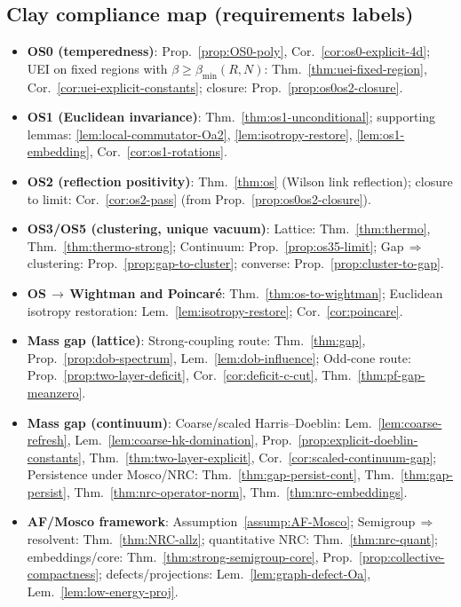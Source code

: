 \documentclass[11pt]{amsart}
\theoremstyle{plain}
\theoremstyle{definition}
\theoremstyle{remark}
\begin{document}
\subsection*{Clay compliance map (requirements \textrightarrow{} labels)}
\begin{itemize}
  \item \textbf{OS0 (temperedness)}: Prop.~\ref{prop:OS0-poly}, Cor.~\ref{cor:os0-explicit-4d}; UEI on fixed regions with $\beta\ge \beta_{\min}(R,N)$: Thm.~\ref{thm:uei-fixed-region}, Cor.~\ref{cor:uei-explicit-constants}; closure: Prop.~\ref{prop:os0os2-closure}.
  \item \textbf{OS1 (Euclidean invariance)}: Thm.~\ref{thm:os1-unconditional}; supporting lemmas: \ref{lem:local-commutator-Oa2}, \ref{lem:isotropy-restore}, \ref{lem:os1-embedding}, Cor.~\ref{cor:os1-rotations}.
  \item \textbf{OS2 (reflection positivity)}: Thm.~\ref{thm:os} (Wilson link reflection); closure to limit: Cor.~\ref{cor:os2-pass} (from Prop.~\ref{prop:os0os2-closure}).
  \item \textbf{OS3/OS5 (clustering, unique vacuum)}: Lattice: Thm.~\ref{thm:thermo}, Thm.~\ref{thm:thermo-strong}; Continuum: Prop.~\ref{prop:os35-limit}; Gap\,$\Rightarrow$\,clustering: Prop.~\ref{prop:gap-to-cluster}; converse: Prop.~\ref{prop:cluster-to-gap}.
  \item \textbf{OS\,$\to$\,Wightman and Poincar\'e}: Thm.~\ref{thm:os-to-wightman}; Euclidean isotropy restoration: Lem.~\ref{lem:isotropy-restore}; Cor.~\ref{cor:poincare}.
  \item \textbf{Mass gap (lattice)}: Strong-coupling route: Thm.~\ref{thm:gap}, Prop.~\ref{prop:dob-spectrum}, Lem.~\ref{lem:dob-influence}; Odd-cone route: Prop.~\ref{prop:two-layer-deficit}, Cor.~\ref{cor:deficit-c-cut}, Thm.~\ref{thm:pf-gap-meanzero}.
  \item \textbf{Mass gap (continuum)}: Coarse/scaled Harris--Doeblin: Lem.~\ref{lem:coarse-refresh}, Lem.~\ref{lem:coarse-hk-domination}, Prop.~\ref{prop:explicit-doeblin-constants}, Thm.~\ref{thm:two-layer-explicit}, Cor.~\ref{cor:scaled-continuum-gap}; Persistence under Mosco/NRC: Thm.~\ref{thm:gap-persist-cont}, Thm.~\ref{thm:gap-persist}, Thm.~\ref{thm:nrc-operator-norm}, Thm.~\ref{thm:nrc-embeddings}.
  \item \textbf{AF/Mosco framework}: Assumption~\ref{assump:AF-Mosco}; Semigroup\,$\Rightarrow$\,resolvent: Thm.~\ref{thm:NRC-allz}; quantitative NRC: Thm.~\ref{thm:nrc-quant}; embeddings/core: Thm.~\ref{thm:strong-semigroup-core}, Prop.~\ref{prop:collective-compactness}; defects/projections: Lem.~\ref{lem:graph-defect-Oa}, Lem.~\ref{lem:low-energy-proj}.

\end{itemize}
\end{document}
